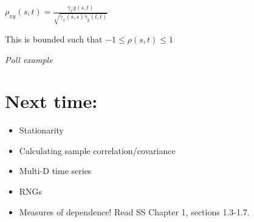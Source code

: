 \documentclass{article}
\begin{document}
$\rho_{xy}(s,t) = \frac{\gamma_xy(s,t)}{\sqrt{\gamma_x(s,s)\gamma_y(t,t)}}$

This is bounded such that $-1 \leq \rho(s,t) \leq 1$

\textit{Poll example}

\section{Next time:}

\begin{itemize}
\item Stationarity
\item Calculating sample correlation/covariance
\item Multi-D time series
\item RNGs
\item Measures of dependence! Read SS Chapter 1, sections 1.3-1.7.
\end{itemize}
\end{document}
